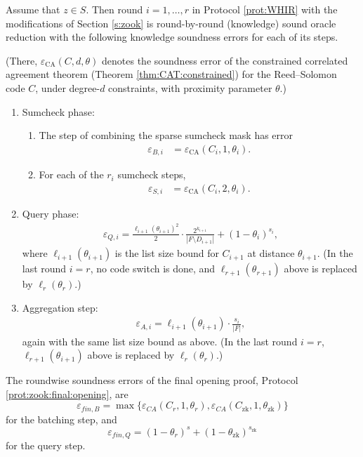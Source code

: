 \begin{thm}
\label{thm:zook:soundness}
Assume that $z\in S$.
Then round $i=1,\ldots, r$ in Protocol \ref{prot:WHIR} with the modifications of Section \ref{s:zook}
is round-by-round (knowledge) sound oracle reduction with the following knowledge soundness errors for each of its steps.

(There, $\varepsilon_\text{CA}(C,d,\theta)$ denotes the soundness error of the constrained correlated agreement theorem (Theorem \ref{thm:CAT:constrained}) for the Reed--Solomon code $C$, under degree-$d$ constraints, with proximity parameter $\theta$.)
\begin{enumerate}
    \item 
    Sumcheck phase:
    \begin{enumerate}
        \item 
        The step of combining the sparse sumcheck mask has error
        \begin{align}
        \label{e:zook:soundness:batching}
        \varepsilon_{B,i} &= \varepsilon_{\text{CA}}(C_{i},1,\theta_{i}).
        \end{align}
        \item 
        For each of the $r_i$ sumcheck steps,
        \begin{align}
        \label{e:zook:soundness:sumcheck}
           \varepsilon_{S,i} &= \varepsilon_{\text{CA}}(C_{i},2,\theta_{i}).
        \end{align}
    \end{enumerate}
    \item 
    Query phase:
    \begin{align}
    \label{e:zook:soundness:query}
        \varepsilon_{Q,i} = \frac{\ell_{i+1}(\theta_{i+1})^2}{2} \cdot \frac{2^{k_{i+1}}}{|F\setminus D_{i+1}|} + (1 -\theta_{i})^{s_i},
    \end{align}
    where $\ell_{i+1}(\theta_{i+1})$ is the list size bound for $C_{i+1}$ at distance $\theta_{i+1}$.
    (In the last round $i=r$, no code switch is done, and $\ell_{r+1}(\theta_{r+1})$ above is replaced by $\ell_r(\theta_r)$.) 
    \item 
    Aggregation step:
    \begin{align}
    \label{e:zook:soundness:aggregation}
        \varepsilon_{A,i} = \ell_{i+1}(\theta_{i+1}) \cdot \frac{s_{i}}{|F|},
    \end{align}
    again with the same list size bound as above.
    (In the last round $i=r$, $\ell_{r+1}(\theta_{i+1})$ above is replaced by $\ell_r(\theta_r)$.) 
\end{enumerate}
The roundwise soundness errors of the final opening proof, Protocol \ref{prot:zook:final:opening}, are
\begin{equation}
\varepsilon_{fin,B} = \max\big\{
\varepsilon_{CA}(C_r,1,\theta_r), \varepsilon_{CA}(C_\text{zk},1,\theta_\text{zk})
\big\}
\end{equation}
for the batching step, and 
\begin{equation}
\varepsilon_{fin,Q} = (1 - \theta_r)^{s} + (1 - \theta_\text{zk})^{s_\text{zk}}
\end{equation}
for the query step.
\end{thm}

